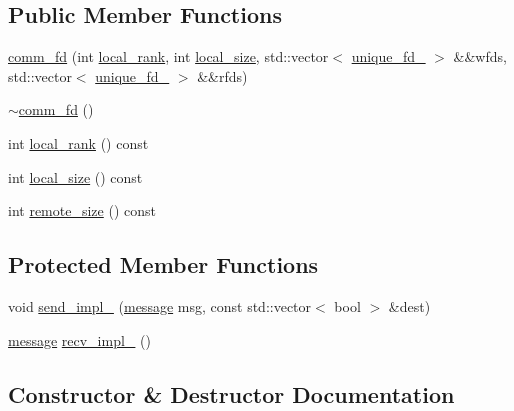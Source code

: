 \subsection*{Public Member Functions}
\begin{DoxyCompactItemize}
\item 
\hyperlink{classmui_1_1comm__fd_a8b867ed149ab5c043c0ca5fbddd986c0}{comm\+\_\+fd} (int \hyperlink{classmui_1_1comm__fd_ae149073567b5f9997fa3f4bd5fae0336}{local\+\_\+rank}, int \hyperlink{classmui_1_1comm__fd_a9c119bf4de88c8047488750deb2e78ef}{local\+\_\+size}, std\+::vector$<$ \hyperlink{classmui_1_1unique__fd__}{unique\+\_\+fd\+\_\+} $>$ \&\&wfds, std\+::vector$<$ \hyperlink{classmui_1_1unique__fd__}{unique\+\_\+fd\+\_\+} $>$ \&\&rfds)
\item 
\hyperlink{classmui_1_1comm__fd_af584f7becf55e3df14581571ffc71100}{$\sim$comm\+\_\+fd} ()
\item 
int \hyperlink{classmui_1_1comm__fd_ae149073567b5f9997fa3f4bd5fae0336}{local\+\_\+rank} () const
\item 
int \hyperlink{classmui_1_1comm__fd_a9c119bf4de88c8047488750deb2e78ef}{local\+\_\+size} () const
\item 
int \hyperlink{classmui_1_1comm__fd_a6d5e989af8268c87b7c7bcd18a0a9a11}{remote\+\_\+size} () const
\end{DoxyCompactItemize}
\subsection*{Protected Member Functions}
\begin{DoxyCompactItemize}
\item 
void \hyperlink{classmui_1_1comm__fd_a025e0264f0424a2b28f3c14ecde5ba24}{send\+\_\+impl\+\_\+} (\hyperlink{structmui_1_1message}{message} msg, const std\+::vector$<$ bool $>$ \&dest)
\item 
\hyperlink{structmui_1_1message}{message} \hyperlink{classmui_1_1comm__fd_a426bda7ebea0817e24fef87552993756}{recv\+\_\+impl\+\_\+} ()
\end{DoxyCompactItemize}


\subsection{Constructor \& Destructor Documentation}
\mbox{\label{classmui_1_1comm__fd_a8b867ed149ab5c043c0ca5fbddd986c0}} 
